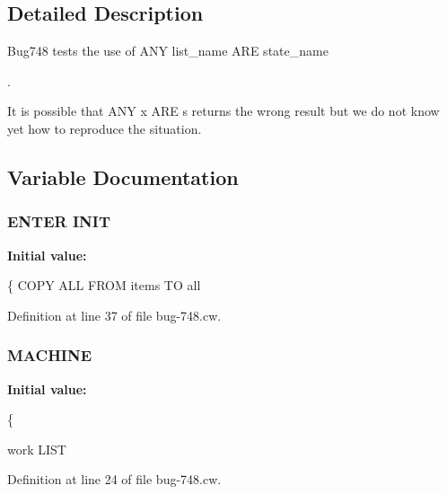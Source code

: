 \subsection{Detailed Description}
Bug748 tests the use of A\+N\+Y list\+\_\+name A\+R\+E state\+\_\+name 
\begin{DoxyVerbInclude}
\end{DoxyVerbInclude}
. 

It is possible that A\+N\+Y x A\+R\+E s returns the wrong result but we do not know yet how to reproduce the situation. 

\subsection{Variable Documentation}
\hypertarget{bug-748_8cw_a6a172404ce64633a9f95df6568ab81c5}{}
\subsubsection[{I\+N\+I\+T}]{\setlength{\rightskip}{0pt plus 5cm}E\+N\+T\+E\+R I\+N\+I\+T}\label{bug-748_8cw_a6a172404ce64633a9f95df6568ab81c5}
{\bfseries Initial value\+:}
\begin{DoxyCode}
\{
        COPY ALL FROM items TO all
\end{DoxyCode}


Definition at line 37 of file bug-\/748.\+cw.

\hypertarget{bug-748_8cw_a0e97e6e6f13793f7ad0ac72e502748c8}{}
\subsubsection[{M\+A\+C\+H\+I\+N\+E}]{ M\+A\+C\+H\+I\+N\+E}\label{bug-748_8cw_a0e97e6e6f13793f7ad0ac72e502748c8}
{\bfseries Initial value\+:}
\begin{DoxyCode}
\{

    work LIST
\end{DoxyCode}


Definition at line 24 of file bug-\/748.\+cw.

